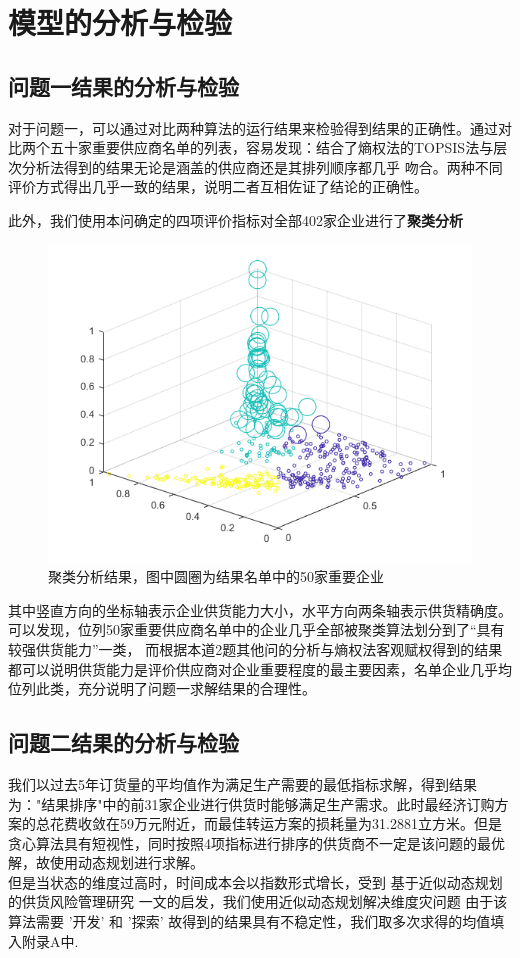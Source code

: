 \documentclass[withoutpreface,bwprint]{cumcmthesis}
\begin{document}
\section{模型的分析与检验}
\subsection{问题一结果的分析与检验}
对于问题一，可以通过对比两种算法的运行结果来检验得到结果的正确性。通过对比两个五十家重要供应商名单的列表，容易发现：结合了熵权法的TOPSIS法与层次分析法得到的结果无论是涵盖的供应商还是其排列顺序都几乎
吻合。两种不同评价方式得出几乎一致的结果，说明二者互相佐证了结论的正确性。\par
此外，我们使用本问确定的四项评价指标对全部402家企业进行了\textbf{聚类分析}
\begin{figure}[H]
    \centering
    \includegraphics[scale = 0.7]{julei.png}
    \centering
    \caption{聚类分析结果，图中圆圈为结果名单中的50家重要企业} \label{fig:5}
\end{figure}
其中竖直方向的坐标轴表示企业供货能力大小，水平方向两条轴表示供货精确度。可以发现，位列50家重要供应商名单中的企业几乎全部被聚类算法划分到了“具有较强供货能力”一类，
而根据本道2题其他问的分析与熵权法客观赋权得到的结果都可以说明供货能力是评价供应商对企业重要程度的最主要因素，名单企业几乎均位列此类，充分说明了问题一求解结果的合理性。
\subsection{问题二结果的分析与检验}
我们以过去5年订货量的平均值作为满足生产需要的最低指标求解，得到结果为："结果排序"中的前31家企业进行供货时能够满足生产需求。此时最经济订购方案的总花费收敛在59万元附近，而最佳转运方案的损耗量为31.2881立方米。但是贪心算法具有短视性，同时按照4项指标进行排序的供货商不一定是该问题的最优解，故使用动态规划进行求解。\\
但是当状态的维度过高时，时间成本会以指数形式增长，受到 基于近似动态规划的供货风险管理研究\cite {RN10} 一文的启发，我们使用近似动态规划解决维度灾问题
由于该算法需要 '开发' 和 '探索' 故得到的结果具有不稳定性，我们取多次求得的均值填入附录A中.
\end{document}
